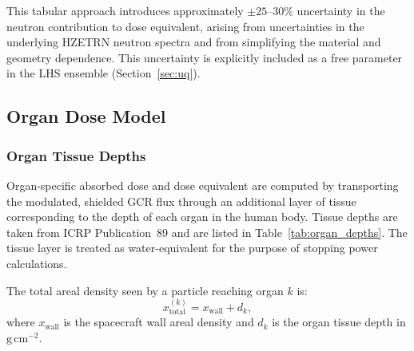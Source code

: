 This tabular approach introduces approximately
$\pm 25$--$30\%$ uncertainty in the neutron contribution to dose equivalent,
arising from uncertainties in the underlying HZETRN neutron spectra and
from simplifying the material and geometry dependence.
This uncertainty is explicitly included as a free parameter in the
LHS ensemble (Section~\ref{sec:uq}).

\subsection{Organ Dose Model}
\label{sec:organdose}

\subsubsection{Organ Tissue Depths}
\label{sec:depths}

Organ-specific absorbed dose and dose equivalent are computed by transporting
the modulated, shielded GCR flux through an additional layer of tissue
corresponding to the depth of each organ in the human body.
Tissue depths are taken from ICRP Publication~89 \citep{icrp89} and are
listed in Table~\ref{tab:organ_depths}.
The tissue layer is treated as water-equivalent for the purpose of stopping
power calculations.

The total areal density seen by a particle reaching organ $k$ is:
\begin{equation}
  x_\mathrm{total}^{(k)} = x_\mathrm{wall} + d_k,
  \label{eq:total_depth}
\end{equation}
where $x_\mathrm{wall}$ is the spacecraft wall areal density and $d_k$ is
the organ tissue depth in $\mathrm{g\,cm^{-2}}$.


